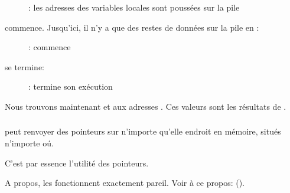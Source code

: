 \begin{figure}[H]
\centering
{}
\caption{\olly: les adresses des variables locales sont poussées sur la pile}
\label{fig:pointers_olly_stk_1}
\end{figure}

\clearpage
\ttfone commence.
Jusqu'ici, il n'y a que des restes de données sur la pile en \PtrsAddresses :

\begin{figure}[H]
\centering
{}
\caption{\olly: \ttfone commence}
\label{fig:pointers_olly_stk_2}
\end{figure}

\clearpage
\ttfone se termine:

\begin{figure}[H]
\centering
{}
\caption{\olly: \ttfone termine son exécution}
\label{fig:pointers_olly_stk_3}
\end{figure}

Nous trouvons maintenant  et  aux adresses \PtrsAddresses.
Ces valeurs sont les résultats de \ttfone.

\subsubsection{\Conclusion{}}
 
\ttfone peut renvoyer des pointeurs sur n'importe qu'elle endroit en mémoire, situés
n'importe oú.

C'est par essence l'utilité des pointeurs.

A propos, les  \Cpp fonctionnent exactement pareil. Voir à ce propos:
().
